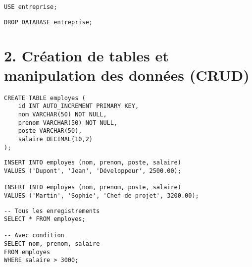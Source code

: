\documentclass[a4paper,11pt]{article}
\begin{document}
\begin{tcolorbox}[colback=green!5!white,colframe=green!75!black,title=Utiliser une base de données]
\begin{verbatim}
USE entreprise;
\end{verbatim}
\end{tcolorbox}

\begin{tcolorbox}[colback=red!5!white,colframe=red!75!black,title=Supprimer une base de données]
\begin{verbatim}
DROP DATABASE entreprise;
\end{verbatim}
\end{tcolorbox}


\section*{2. Création de tables et manipulation des données (CRUD)}

\begin{tcolorbox}[colback=blue!5!white,colframe=blue!75!black,title=Créer une table]
\begin{verbatim}
CREATE TABLE employes (
    id INT AUTO_INCREMENT PRIMARY KEY,
    nom VARCHAR(50) NOT NULL,
    prenom VARCHAR(50) NOT NULL,
    poste VARCHAR(50),
    salaire DECIMAL(10,2)
);
\end{verbatim}
\end{tcolorbox}

\begin{tcolorbox}[colback=green!5!white,colframe=green!75!black,title=Insérer des données (INSERT)]
\begin{verbatim}
INSERT INTO employes (nom, prenom, poste, salaire)
VALUES ('Dupont', 'Jean', 'Développeur', 2500.00);

INSERT INTO employes (nom, prenom, poste, salaire)
VALUES ('Martin', 'Sophie', 'Chef de projet', 3200.00);
\end{verbatim}
\end{tcolorbox}

\begin{tcolorbox}[colback=yellow!5!white,colframe=yellow!75!black,title=Lire les données (SELECT)]
\begin{verbatim}
-- Tous les enregistrements
SELECT * FROM employes;

-- Avec condition
SELECT nom, prenom, salaire
FROM employes
WHERE salaire > 3000;
\end{verbatim}
\end{tcolorbox}
\end{document}
